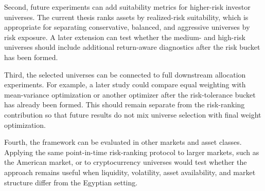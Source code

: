 Second, future experiments can add suitability metrics for higher-risk investor universes. The current thesis ranks assets by realized-risk suitability, which is appropriate for separating conservative, balanced, and aggressive universes by risk exposure. A later extension can test whether the medium- and high-risk universes should include additional return-aware diagnostics after the risk bucket has been formed.

Third, the selected universes can be connected to full downstream allocation experiments. For example, a later study could compare equal weighting with mean-variance optimization or another optimizer after the risk-tolerance bucket has already been formed. This should remain separate from the risk-ranking contribution so that future results do not mix universe selection with final weight optimization.

Fourth, the framework can be evaluated in other markets and asset classes. Applying the same point-in-time risk-ranking protocol to larger markets, such as the American market, or to cryptocurrency universes would test whether the approach remains useful when liquidity, volatility, asset availability, and market structure differ from the Egyptian setting.
